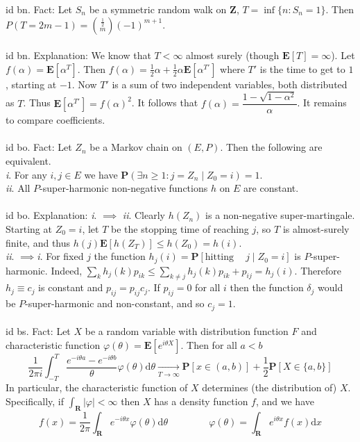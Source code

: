 \documentclass[oneside]{book}
\newcommand{\tabb}{\phantom{aaaa}}
\newcommand{\vphi}{\varphi}
\newcommand{\Z}{\mathbf{Z}}
\newcommand{\R}{\mathbf{R}}
\renewcommand{\P}{\mathbf{P}}
\newcommand{\E}{\mathbf{E}}
\newcommand{\set}[1]{\{ #1\}}
\newcommand{\fit}[1]{\left( #1\right)}
\renewcommand{\d}{\mathrm{d}}
\newcommand{\spc}{\phantom{-}}
\renewcommand{\i}{{\it i}. }
\newcommand{\ii}{{\it ii}. }
\begin{document}
id bn. Fact: Let $S_n$ be a symmetric random walk on $\Z$, $T=\inf\set{n:S_n=1}$. Then $P(T=2m-1)=\displaystyle\binom{\frac{1}{2}}{m}(-1)^{m+1}$. \\\\


id bn. Explanation: We know that $T<\infty$ almost surely (though $\E[T]=\infty$). Let $f(\alpha)=\E[\alpha^T]$. Then $f(\alpha)=\frac{1}{2}\alpha+\frac{1}{2}\alpha \E[\alpha^{T'}]$ where $T'$ is the time to get to $1$, starting at $-1$. Now $T'$ is a sum of two independent variables, both distributed as $T$. Thus $\E[\alpha^{T'}]=f(\alpha)^2$. It follows that $f(\alpha)=\dfrac{1-\sqrt{1-\alpha^2}}{\alpha}$. It remains to compare coefficients. \\\\


id bo. Fact: Let $Z_n$ be a Markov chain on $(E,P)$. Then the following are equivalent.\\
\i For any $i,j\in E$ we have $\P\fit{\exists n\ge 1: j=Z_n\mid Z_0=i}=1$. \\
\ii All $P$-super-harmonic non-negative functions $h$ on $E$ are constant.  \\\\


id bo. Explanation: \i$\implies$ \ii Clearly $h(Z_n)$ is a non-negative super-martingale. Starting at $Z_0=i$, let $T$ be the stopping time of reaching $j$, so $T$ is almost-surely finite, and thus $h(j)\E[h(Z_T)]\le h(Z_0)=h(i)$.\\
\ii$\implies$\i For fixed $j$ the function $h_j(i)=\P[\text{hitting}\spc j\mid Z_0=i]$ is $P$-super-harmonic. Indeed, $\sum_k h_j(k)p_{ik}\le \sum_{k\neq j}h_j(k)p_{ik}+p_{ij}=h_j(i)$. Therefore $h_j\equiv c_j$ is constant and $p_{ij}=p_{ij}c_j$. If $p_{ij}=0$ for all $i$ then the function $\delta_j$ would be $P$-super-harmonic and non-constant, and so $c_j=1$. \\\\


id bs. Fact: Let $X$ be a random variable with distribution function $F$ and characteristic function $\vphi(\theta)=\E[e^{i\theta X}]$. Then for all $a<b$ $$\frac{1}{2\pi i}\int_{-T}^T\dfrac{e^{-i\theta a}-e^{-i\theta b}}{\theta}\vphi(\theta)\d \theta \underset{T\to\infty}{\longrightarrow} \P[x\in(a,b)] + \frac{1}{2}\P[X\in\set{a,b}]$$
In particular, the characteristic function of $X$ determines (the distribution of) $X$. Specifically, if $\int_\R|\vphi| < \infty$ then $X$ has a density function $f$, and we have
$$f(x)=\dfrac{1}{2\pi}\int_\R e^{-i\theta x}\vphi(\theta)\d \theta\tabb\tabb\vphi(\theta)=\int_\R e^{i\theta x}f(x)\d x$$
\\
\end{document}
